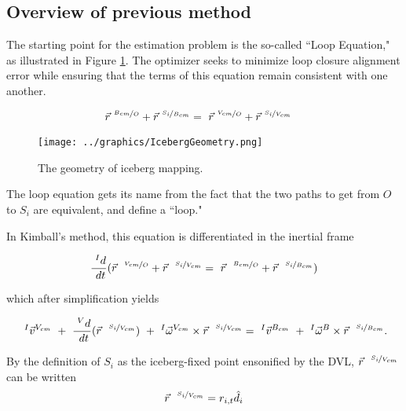 \subsection{Overview of previous method}
The starting point for the estimation problem is the so-called ``Loop Equation," as illustrated in Figure \ref{fig:LoopEquation}. The optimizer seeks to minimize loop closure alignment error while ensuring that the terms of this equation remain consistent with one another. 

\begin{align}
\vec{r}^{~\nicefrac{B_{cm}}{O}} + \vec{r}^{~\nicefrac{S_i}{B_{cm}}} &= ~\vec{r}^{~\nicefrac{V_{cm}}{O}} + \vec{r}^{~\nicefrac{S_i}{V_{cm}}}
\label{eqn:BasicLoop}
\end{align}

\begin{figure}[htbp]
   \centering
   \texttt{[image: ../graphics/IcebergGeometry.png]} %
   \caption{The geometry of iceberg mapping. }  
    \label{fig:LoopEquation}
\end{figure}

The loop equation gets its name from the fact that the two paths to get from $O$ to $S_i$ are equivalent, and define a ``loop."

In Kimball's method, this equation is differentiated in the inertial frame

\begin{equation} %
   \frac{~^Id}{~dt}(\vec{r}^{~~\nicefrac{V_{cm}}{O}} + \vec{r}^{~~\nicefrac{S_i}{V_{cm}}} = ~ \vec{r}^{~~\nicefrac{B_{cm}}{O}} + \vec{r}^{~~\nicefrac{S_i}{B_{cm}}})\\
   \end{equation}
   
   which after simplification yields 
   
       \begin{equation}
    ~^{I}\vec{v}^{V_{cm}} ~+~ \frac{~^Vd}{~dt}(\vec{r}^{~~\nicefrac{S_i}{V_{cm}}} ) ~+~ ^{I}\vec{\omega}^{V_{cm}}\times\vec{r}^{~~\nicefrac{S_i}{V_{cm}}}  = 
    ~^{I}\vec{v}^{B_{cm}} ~+~^{I}\vec{\omega}^{B}\times\vec{r}^{~~\nicefrac{S_i}{B_{cm}}}. \\
\end{equation}

By the definition of $S_i$ as the iceberg-fixed point ensonified by the DVL,  $\vec{r}^{~~\nicefrac{S_i}{V_{cm}}}$ can be written 
\begin{equation}
\vec{r}^{~~\nicefrac{S_i}{V_{cm}}}= r_{i,t}\hat{d}_{i}  
\label{eqn:SiDef}
\end{equation}

